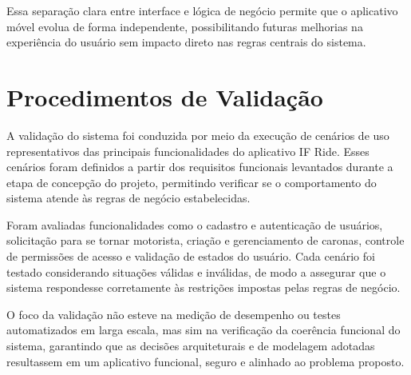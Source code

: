 Essa separação clara entre interface e lógica de negócio permite que o aplicativo móvel evolua de forma independente, possibilitando futuras melhorias na experiência do usuário sem impacto direto nas regras centrais do sistema.

\section{Procedimentos de Validação}

A validação do sistema foi conduzida por meio da execução de cenários de uso representativos das principais funcionalidades do aplicativo IF Ride. Esses cenários foram definidos a partir dos requisitos funcionais levantados durante a etapa de concepção do projeto, permitindo verificar se o comportamento do sistema atende às regras de negócio estabelecidas.

Foram avaliadas funcionalidades como o cadastro e autenticação de usuários, solicitação para se tornar motorista, criação e gerenciamento de caronas, controle de permissões de acesso e validação de estados do usuário. Cada cenário foi testado considerando situações válidas e inválidas, de modo a assegurar que o sistema respondesse corretamente às restrições impostas pelas regras de negócio.

O foco da validação não esteve na medição de desempenho ou testes automatizados em larga escala, mas sim na verificação da coerência funcional do sistema, garantindo que as decisões arquiteturais e de modelagem adotadas resultassem em um aplicativo funcional, seguro e alinhado ao problema proposto.